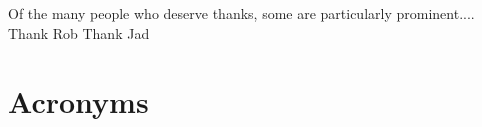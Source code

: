 \begin{acknowledgements}
  Of the many people who deserve thanks, some are particularly prominent....
  Thank Rob
  Thank Jad
 
\end{acknowledgements}



  

\tableofcontents
\listoffigures
\listoftables
\newpage
\section*{Acronyms}

